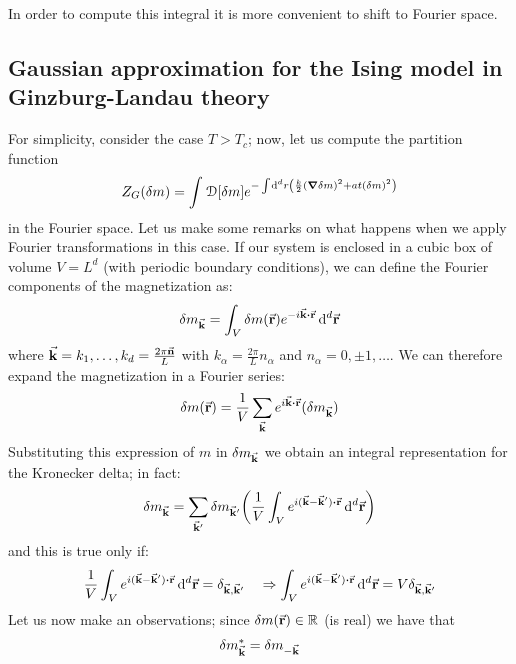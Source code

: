 \documentclass[../main/main.tex]{subfiles}
\begin{document}
In order to compute this integral it is more convenient to shift to Fourier space.




\subsection{Gaussian approximation for the Ising model in Ginzburg-Landau theory}
For simplicity, consider the case \( T>T_c \); now, let us compute the partition function
\begin{equation}
  Z_{G} (\delta m) = \int_{}^{} \mathcal{D} \qty[\delta m] e^{- \int_{}^{} \dd[d]{r} \qty(\frac{k}{2} \qty(\grad \delta m)^2 + a t (\delta m)^2  )  }
 \end{equation}
 in the Fourier space.
 Let us make some remarks on what happens when we apply Fourier transformations in this case. If our system is enclosed in a cubic box of volume \( V = L^d \) (with periodic boundary conditions), we can define the Fourier components of the magnetization as:
 \begin{equation}
   \delta m_{\va{k}} = \int_{V}^{}  \delta m (\va{r}) e^{-i \va{k} \vdot \va{r} }\dd[d]{\va{r}}
 \end{equation}
 where \( \va{k} = k_1, \dots, k_d = \frac{2 \pi  \va{n} }{L}\) with \( k_ \alpha = \frac{2 \pi }{L} n_ \alpha  \) and \( n_ \alpha  = 0 , \pm 1, \dots \). We can therefore expand the magnetization in a Fourier series:
 \begin{equation}
   \delta m (\va{r}) = \frac{1}{V} \sum_{\va{k}}  e^{i \va{k}\vdot \va{r}} (\delta m_{\va{k}})
 \end{equation}
 Substituting this expression of \( m \) in \( \delta m_{\va{k}} \) we obtain an integral representation for the Kronecker delta; in fact:
 \begin{equation*}
   \delta m_{\va{k}} = \sum_{\va{k}'}^{}  \delta m_{\va{k}'} \qty( \frac{1}{V} \int_{V}^{} e^{i(\va{k}-\va{k}')\vdot \va{r}} \dd[d]{\va{r}}  )
 \end{equation*}
and this is true only if:
\begin{equation*}
  \frac{1}{V} \int_{V}^{} e^{i(\va{k}-\va{k}')\vdot \va{r}} \dd[d]{\va{r}} = \delta _{\va{k},\va{k}'} \quad \Rightarrow   \int_{V}^{} e^{i(\va{k}-\va{k}')\vdot \va{r}} \dd[d]{\va{r}} = V \delta _{\va{k},\va{k}'}
\end{equation*}
Let us now make an observations; since \( \delta m (\va{r}) \in \mathbb{R} \) (is real) we have that
\begin{equation*}
  \delta m^*_{\va{k}} =  \delta m_{-\va{k}}
\end{equation*}
\end{document}
